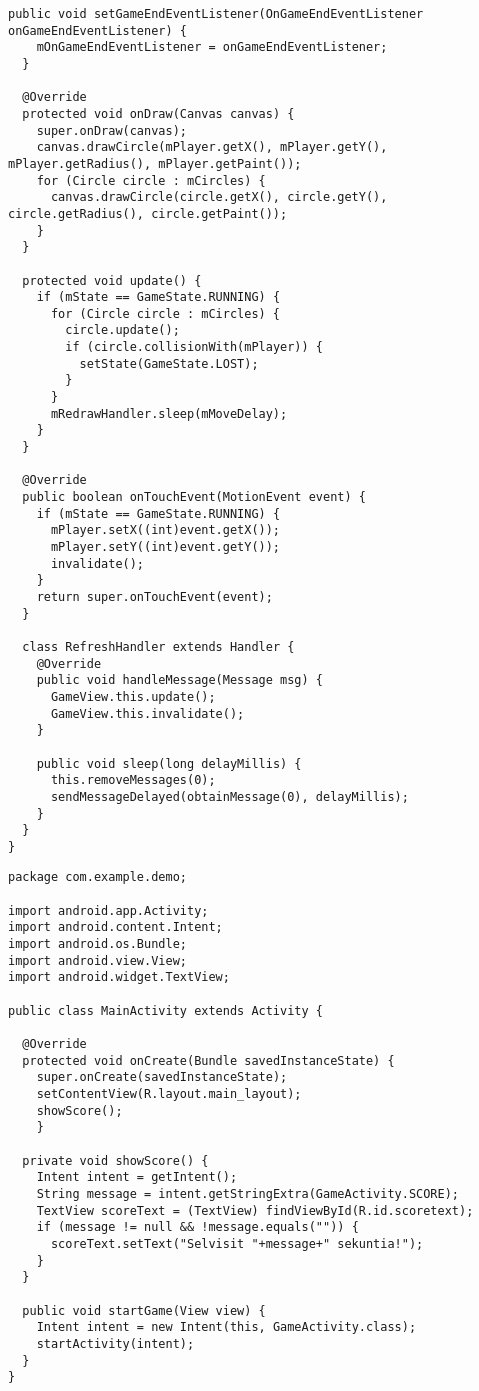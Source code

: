 \begin{lstlisting}[caption=GameView.java]
  public void setGameEndEventListener(OnGameEndEventListener onGameEndEventListener) {
    mOnGameEndEventListener = onGameEndEventListener;
  }

  @Override
  protected void onDraw(Canvas canvas) {
    super.onDraw(canvas);
    canvas.drawCircle(mPlayer.getX(), mPlayer.getY(), mPlayer.getRadius(), mPlayer.getPaint());
    for (Circle circle : mCircles) {
      canvas.drawCircle(circle.getX(), circle.getY(), circle.getRadius(), circle.getPaint());
    }
  }
	
  protected void update() {
    if (mState == GameState.RUNNING) {
      for (Circle circle : mCircles) {
        circle.update();
        if (circle.collisionWith(mPlayer)) {
          setState(GameState.LOST);
        }
      }
      mRedrawHandler.sleep(mMoveDelay);
    }
  }

  @Override
  public boolean onTouchEvent(MotionEvent event) {
    if (mState == GameState.RUNNING) {
      mPlayer.setX((int)event.getX());
      mPlayer.setY((int)event.getY());
      invalidate();
    }
    return super.onTouchEvent(event);
  }
	
  class RefreshHandler extends Handler {
    @Override
    public void handleMessage(Message msg) {
      GameView.this.update();
      GameView.this.invalidate();
    }

    public void sleep(long delayMillis) {
      this.removeMessages(0);
      sendMessageDelayed(obtainMessage(0), delayMillis);
    }
  }
}
\end{lstlisting}

\begin{lstlisting}[caption=MainActivity.java]
package com.example.demo;

import android.app.Activity;
import android.content.Intent;
import android.os.Bundle;
import android.view.View;
import android.widget.TextView;

public class MainActivity extends Activity {

  @Override
  protected void onCreate(Bundle savedInstanceState) {
    super.onCreate(savedInstanceState);
    setContentView(R.layout.main_layout);
    showScore();
	}

  private void showScore() {
    Intent intent = getIntent();
    String message = intent.getStringExtra(GameActivity.SCORE);
    TextView scoreText = (TextView) findViewById(R.id.scoretext);
    if (message != null && !message.equals("")) {
      scoreText.setText("Selvisit "+message+" sekuntia!");
    }
  }
	
  public void startGame(View view) {
    Intent intent = new Intent(this, GameActivity.class);
    startActivity(intent);
  }
}
\end{lstlisting}

